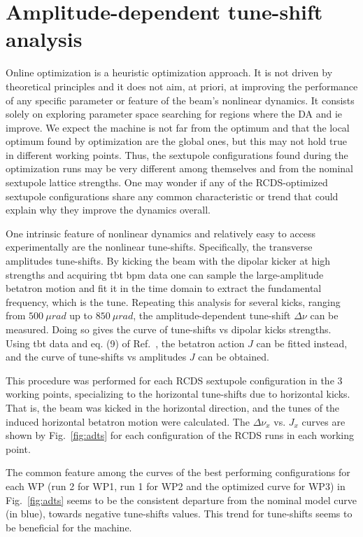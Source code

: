 \section{Amplitude-dependent tune-shift analysis}
Online optimization is a heuristic optimization approach. It is not driven by theoretical principles and it does not aim, at priori, at improving the performance of any specific parameter or feature of the beam's nonlinear dynamics. It consists solely on exploring parameter space searching for regions where the \gls*{DA} and \gls*{ie} improve. We expect the machine is not far from the optimum and  that the local optimum found by optimization are the global ones, but this may not hold true in different working points. Thus, the sextupole configurations found during the optimization runs may be very different among themselves and from the nominal sextupole lattice strengths. One may wonder if any of the \gls*{RCDS}-optimized sextupole configurations share any common characteristic or trend that could explain why they improve the dynamics overall.

One intrinsic feature of nonlinear dynamics and relatively easy to access experimentally are the nonlinear tune-shifts. Specifically, the transverse amplitudes tune-shifts. By kicking the beam with the dipolar kicker at high strengths and acquiring \gls*{tbt} \gls*{bpm} data one can sample the large-amplitude betatron motion and fit it in the time domain to extract the fundamental frequency, which is the tune. Repeating this analysis for  several kicks, ranging from $500~\unit{\mu rad}$ up to $850~\unit{\mu rad}$, the amplitude-dependent tune-shift $\Delta\nu$ can be measured. Doing so gives the curve of tune-shifts vs dipolar kicks strengths. Using \gls*{tbt} data and eq. (9) of Ref.~\cite{resende_equilibrium_2021}, the betatron action $J$ can be fitted instead, and the curve of tune-shifts vs amplitudes $J$ can be obtained.

This procedure was performed for each \gls*{RCDS} sextupole configuration in the 3 working points, specializing to the horizontal tune-shifts due to horizontal kicks. That is, the beam was kicked in the horizontal direction, and the tunes of the induced horizontal betatron motion were calculated. The $\Delta \nu_x$ vs. $J_x$ curves are shown by Fig.~\ref{fig:adts} for each configuration of the \gls*{RCDS} runs in each working point.

The common feature among the curves of the best performing configurations for each WP (run 2 for \gls*{WP1}, run 1 for \gls*{WP2} and the optimized curve for \gls*{WP3}) in Fig.~\ref{fig:adts} seems to be the consistent departure from the nominal model curve (in blue), towards negative tune-shifts values. This trend for tune-shifts seems to be beneficial for the machine.

